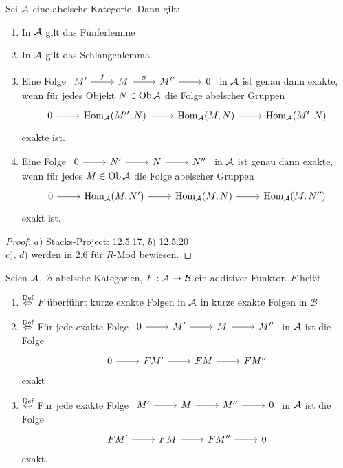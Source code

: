 \begin{sa}\label{5.26}
	Sei $\mathcal{A}$ eine abelsche Kategorie. Dann gilt:
	\begin{enumerate}[label= \alph*)]
		\item In $\mathcal{A}$ gilt das Fünferlemme
		\item In $\mathcal{A}$ gilt das Schlangenlemma
		\item Eine Folge $\begin{tikzcd}
		M' \arrow{r}{f} & M \arrow{r}{g} & M'' \arrow{r} & 0
		\end{tikzcd}$ in $\mathcal{A}$ ist genau dann exakte, wenn für jedes Objekt $N\in \text{Ob}\,\mathcal{A}$ die Folge abelscher Gruppen 
		$$\begin{tikzcd}
		0 \arrow{r}& \Hom_\A(M'', N) \arrow{r} & \Hom_\A(M,N) \arrow{r} & \Hom_\A(M', N)
		\end{tikzcd}$$
		exakte ist.
		\item Eine Folge $\begin{tikzcd}
		0 \arrow{r}&  N' \arrow{r} & N \arrow{r}& N''
		\end{tikzcd}$ in $\mathcal{A}$ ist genau dann exakte, wenn für jedes $M\in \text{Ob}\,\mathcal{A}$ die Folge abelscher Gruppen
		$$\begin{tikzcd}
		0 \arrow{r}& \Hom_\A(M, N') \arrow{r} & \Hom_\A(M,N) \arrow{r} & \Hom_\A(M, N'')
		\end{tikzcd}$$
		exakt ist.
	\end{enumerate}
\end{sa}
\begin{proof}
	$a)$ Stacks-Project: 12.5.17, $b)$ 12.5.20\\
	$c), \, d)$ werden in 2.6 für $R$-Mod bewiesen.
\end{proof}
\begin{df}\label{5.27}
	Seien $\mathcal{A}$, $\mathcal{B}$ abelsche Kategorien, $F: \mathcal{A} \to \mathcal{B}$ ein additiver Funktor. $F$ heißt 
	\begin{enumerate}
		\item[]  $\overset{\text{Def}}{\Leftrightarrow}$ $F$ überführt kurze exakte Folgen in $\mathcal{A}$ in kurze exakte Folgen in $\mathcal{B}$
		\item[]  $\overset{\text{Def}}{\Leftrightarrow}$ Für jede exakte Folge $\begin{tikzcd}
		0 \arrow{r} & M' \arrow{r} & M \arrow{r} & M''
		\end{tikzcd}$ in $\mathcal{A}$ ist die Folge $$\begin{tikzcd}
		0 \arrow{r} & FM' \arrow{r} & FM \arrow{r} & FM''
		\end{tikzcd}$$ exakt
		\item[]  $\overset{\text{Def}}{\Leftrightarrow}$ Für jede exakte Folge $\begin{tikzcd}
		M' \arrow{r} & M \arrow{r} & M'' \arrow{r} & 0
		\end{tikzcd}$ in $\mathcal{A}$ ist die Folge
		$$\begin{tikzcd}
		FM' \arrow{r} & FM \arrow{r} & FM''  \arrow{r} & 0
		\end{tikzcd}$$
		exakt.
	\end{enumerate}
\end{df}

